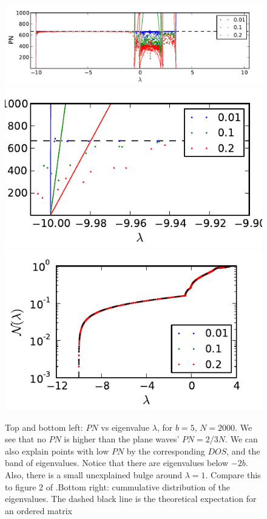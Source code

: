 \documentclass[onecolumn,fleqn,longbibliography]{revtex4}
\begin{document}
\begin{figure}[H]
    \includegraphics{pta_B_DD_low}\\
    \includegraphics{pta_B_DD_low_zoom}
    \includegraphics{pta_B_DD_low_ev}
    \caption{Top and bottom left: $PN$ vs eigenvalue $\lambda$, for $b=5$, $N=2000$. We see that
    no $PN$ is higher than the plane waves' $PN =2/3 N$. We can also explain
    points with low $PN$ by the corresponding $DOS$, and the band of eigenvalues. 
    Notice that there are eigenvalues below $-2b$. Also, there is a small unexplained bulge around $\lambda=1$.
    Compare this to figure 2 of \cite{bodyfelt_scaling_2013}.\protect\footnotemark Bottom right: cummulative distribution
    of the eigenvalues. The dashed black line is the theoretical expectation
    for an ordered matrix}
    \label{fig:ddonly_b5}
\end{figure}
    
\end{document}
